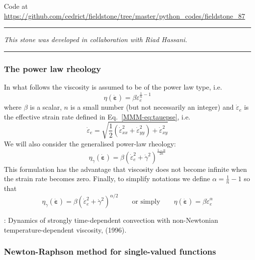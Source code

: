

\begin{center}
Code at \url{https://github.com/cedrict/fieldstone/tree/master/python_codes/fieldstone_87}
\end{center}

\par\noindent\rule{\textwidth}{0.4pt}

{\sl This stone was developed in collaboration with Riad Hassani}. 

\par\noindent\rule{\textwidth}{0.4pt}

\subsubsection*{The power law rheology}

In what follows the viscosity 
is assumed to be of the power law type, i.e.
\[
\eta(\dot{\bm \varepsilon}) = \beta  \dot{\varepsilon}_e^{\frac1n-1}
\]
where $\beta$ is a scalar, $n$ is a small number (but not 
necessarily an integer) and
$\dot{\varepsilon}_e$ is the effective strain rate defined in Eq.~\eqref{MMM-eq:tauepse},
i.e.
\[
\dot\varepsilon_e = \sqrt{ \frac{1}{2}(\dot\varepsilon_{xx}^2 + \dot\varepsilon_{yy}^2 ) 
+ \dot\varepsilon_{xy}^2}
\]
We will also consider the generalised power-law rheology:
\[
\eta_{\dot\gamma}(\dot{\bm \varepsilon})  = \beta  ( \dot{\varepsilon}_e^2 + \dot\gamma^2)^{\frac{1-n}{2n}}
\]
This formulation has the advantage that viscosity does not become infinite 
when the strain rate becomes zero.
Finally, to simplify notations we define $\alpha=\frac1n-1$ so that 
\[
\boxed{
\eta_{\dot\gamma}(\dot{\bm \varepsilon})  = \beta  ( \dot{\varepsilon}_e^2 + \dot\gamma^2)^{\alpha/2}
}
\qquad
\text{or simply}
\qquad
\boxed{
\eta(\dot{\bm \varepsilon})  = \beta  \dot{\varepsilon}_e^\alpha
}
\]

\Literature: Dynamics of strongly time-dependent convection
with non-Newtonian temperature-dependent viscosity, \textcite{laym96} (1996).

\subsubsection*{Newton-Raphson method for single-valued functions}

